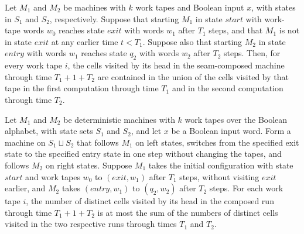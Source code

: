 \begin{theorem}
\label{Turing.seamCompTM_visitedByTapeHead}
\leanok
{}
Let $M_1$ and $M_2$ be machines with $k$ work tapes and Boolean input $x$, with states
in $S_1$ and $S_2$, respectively. Suppose that starting $M_1$ in state $start$ with
work-tape words $w_0$ reaches state $exit$ with words $w_1$ after $T_1$ steps, and that
$M_1$ is not in state $exit$ at any earlier time $t<T_1$. Suppose also that starting
$M_2$ in state $entry$ with words $w_1$ reaches state $q_2$ with words $w_2$ after $T_2$
steps. Then, for every work tape $i$, the cells visited by its head in the seam-composed
machine through time $T_1+1+T_2$ are contained in the union of the cells visited by that
tape in the first computation through time $T_1$ and in the second computation through
time $T_2$.
\end{theorem}

\begin{theorem}
\label{Turing.seamCompTM_spaceUsedByTape_le_add}
\leanok
{}
Let $M_1$ and $M_2$ be deterministic machines with $k$ work tapes over the Boolean
alphabet, with state sets $S_1$ and $S_2$, and let $x$ be a Boolean input word. Form a
machine on $S_1\sqcup S_2$ that follows $M_1$ on left states, switches from the
specified exit state to the specified entry state in one step without changing the
tapes, and follows $M_2$ on right states. Suppose $M_1$ takes the initial configuration
with state $start$ and work tapes $w_0$ to $(exit,w_1)$ after $T_1$ steps, without
visiting $exit$ earlier, and $M_2$ takes $(entry,w_1)$ to $(q_2,w_2)$ after $T_2$ steps.
For each work tape $i$, the number of distinct cells visited by its head in the composed
run through time $T_1+1+T_2$ is at most the sum of the numbers of distinct cells visited
in the two respective runs through times $T_1$ and $T_2$.
\end{theorem}

